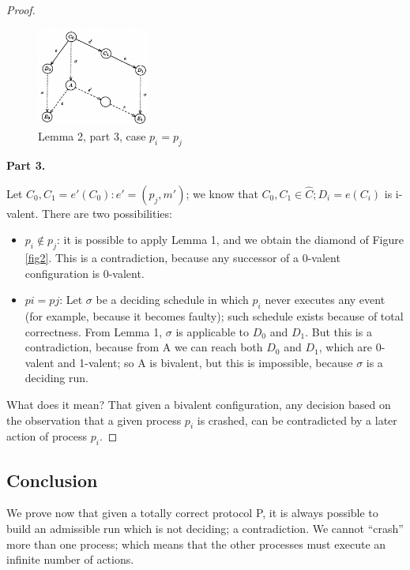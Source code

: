 \documentclass[a4paper,11pt,hidelinks]{article}
\begin{document}
\begin{proof}
    \begin{figure}[!ht]
        \centering
        \includegraphics[width=0.33\textwidth]{drawable/fig3.png}
        \caption{Lemma 2, part 3, case $p_i = p_j$}
        \label{fig3}
    \end{figure}

    \medskip

    \noindent\textbf{Part 3.}

    \medskip

    Let $C_0, C_1 = e'(C_0) : e' = (p_j, m')$; we know that $C_0, C_1 \in \hat{C}; D_i = e(C_i)$ is i-valent. There are two possibilities:

    \begin{itemize}
        \item $p_i \notin p_j$: it is possible to apply Lemma 1, and we obtain the diamond of Figure \ref{fig2}. This is a contradiction, because any successor of a 0-valent configuration is 0-valent.
        \item $pi = pj$: Let $\sigma$ be a deciding schedule in which $p_i$ never executes any event (for example, because it becomes faulty); such schedule exists because of total correctness.
              From Lemma 1, $\sigma$ is applicable to $D_0$ and $D_1$. But this is a contradiction, because from A we can reach both $D_0$ and $D_1$, which are 0-valent and 1-valent; so A is bivalent, but this is impossible, because $\sigma$ is a deciding run.
    \end{itemize}

    What does it mean? That given a bivalent configuration, any decision based
    on the observation that a given process $p_i$ is crashed, can be contradicted by a later action of process $p_i$.
\end{proof}

\subsection{Conclusion}

We prove now that given a totally correct protocol P, it is always possible to build an admissible run which is not deciding; a contradiction. We cannot “crash” more than one process; which means that the other processes must execute an infinite number of actions.
\end{document}
